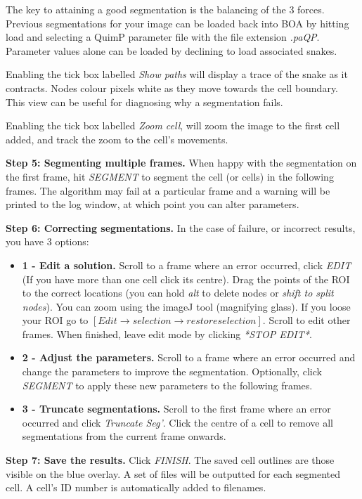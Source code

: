 \documentclass[a4paper,12pt]{article}
\begin{document}
The key to attaining a good segmentation is the balancing of the 3 forces. Previous segmentations for your image can be loaded
back into BOA by hitting load and selecting a QuimP parameter file with the file extension \textit{.paQP}.
Parameter values alone can be loaded by declining to load associated snakes.

Enabling the tick box labelled \textit{Show paths} will display a trace of the snake as it contracts.  Nodes colour pixels white as they
move towards the cell boundary.  This view can be useful for diagnosing why a segmentation fails.

Enabling the tick box labelled \textit{Zoom cell}, will zoom the image to the first cell added, and track the zoom to 
the cell's movements.


\textbf{Step 5: Segmenting multiple frames.}  When happy with the segmentation on the first frame, hit \textit{SEGMENT} to segment
the cell (or cells) in the following frames.  The algorithm may fail at a particular frame and a warning will be printed to the log window,
at which point you can alter parameters.

\textbf{Step 6: Correcting segmentations.}  In the case of failure, or incorrect results, you have 3 options:

\begin{itemize}
\item \textbf{1 - Edit a solution.} Scroll to a frame where an error occurred, click \textit{EDIT} (If you have more than one cell
click its centre). Drag the points of the ROI to the correct locations (you can hold \textit{alt} to delete nodes or \textit{shift to split nodes}).
You can zoom using the imageJ tool (magnifying glass). If you loose your ROI go to $[Edit\rightarrow selection\rightarrow restore selection]$.
Scroll to edit other frames.  When finished, leave edit mode by clicking \textit{*STOP EDIT*}.
\item \textbf{2 - Adjust the parameters.}  Scroll to a frame where an error occurred and change the parameters to improve the segmentation.
Optionally, click \textit{SEGMENT} to apply these new parameters to the following frames.
\item \textbf{3 - Truncate segmentations.}  Scroll to the first frame where an error occurred and click \textit{Truncate Seg'}.  Click the centre
of a cell to remove all segmentations from the current frame onwards.
\end{itemize}


\textbf{Step 7: Save the results.}  Click \textit{FINISH}.  The saved cell outlines are those visible on the blue overlay.
A set of files will be outputted for each segmented cell.  A cell's ID number is automatically added to filenames.
\end{document}
